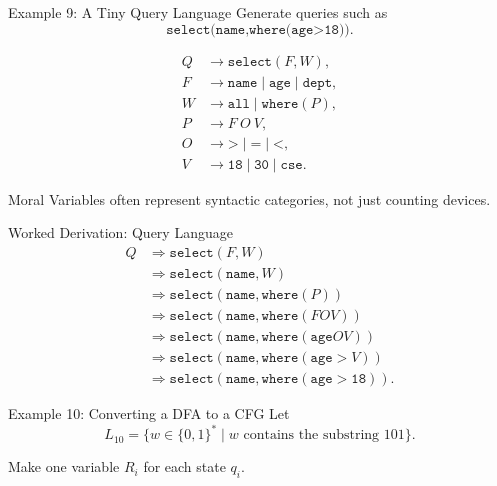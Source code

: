 \documentclass[aspectratio=169,10pt]{beamer}
\newcommand{\der}{\Rightarrow}
\newcommand{\code}[1]{\texttt{#1}}
\begin{document}
\begin{frame}{Example 9: A Tiny Query Language}
\small
Generate queries such as
\[
\code{select(name,where(age>18))}.
\]

\[
\begin{aligned}
Q&\to \code{select}(F,W),\\
F&\to \code{name}\mid\code{age}\mid\code{dept},\\
W&\to \code{all}\mid \code{where}(P),\\
P&\to F\ O\ V,\\
O&\to \code{>}\mid\code{=}\mid\code{<},\\
V&\to \code{18}\mid\code{30}\mid\code{cse}.
\end{aligned}
\]

\begin{block}{Moral}
Variables often represent syntactic categories, not just counting devices.
\end{block}
\end{frame}

\begin{frame}{Worked Derivation: Query Language}
\small
\begin{align*}
Q
&\der \code{select}(F,W)\\
&\der \code{select}(\code{name},W)\\
&\der \code{select}(\code{name},\code{where}(P))\\
&\der \code{select}(\code{name},\code{where}(FOV))\\
&\der \code{select}(\code{name},\code{where}(\code{age}OV))\\
&\der \code{select}(\code{name},\code{where}(\code{age}>V))\\
&\der \code{select}(\code{name},\code{where}(\code{age}>\code{18})).
\end{align*}
\end{frame}

\begin{frame}{Example 10: Converting a DFA to a CFG}
\small
Let
\[
L_{10}=\{w\in\{0,1\}^*\mid w\text{ contains the substring }101\}.
\]

\begin{center}
\end{center}

Make one variable \(R_i\) for each state \(q_i\).
\end{frame}
\end{document}
